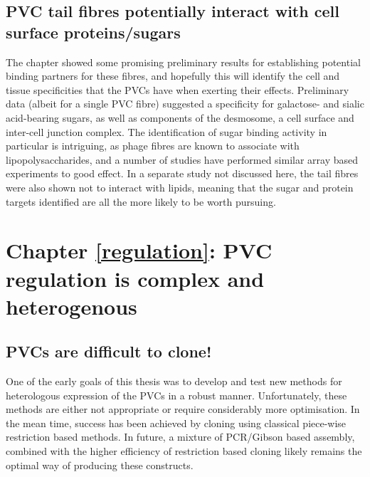 \subsection{PVC tail fibres potentially interact with cell surface proteins/sugars}
The chapter showed some promising preliminary results for establishing potential binding partners for these fibres, and hopefully this will identify the cell and tissue specificities that the PVCs have when exerting their effects. Preliminary data (albeit for a single PVC fibre) suggested a specificity for galactose- and sialic acid-bearing sugars, as well as components of the desmosome, a cell surface and inter-cell junction complex. The identification of sugar binding activity in particular is intriguing, as phage fibres are known to associate with lipopolysaccharides, and a number of studies have performed similar array based experiments to good effect. In a separate study not discussed here, the tail fibres were also shown not to interact with lipids, meaning that the sugar and protein targets identified are all the more likely to be worth pursuing.


\section{Chapter \ref{regulation}: PVC regulation is complex and heterogenous}
\subsection{PVCs are difficult to clone!}
One of the early goals of this thesis was to develop and test new methods for heterologous expression of the PVCs in a robust manner. Unfortunately, these methods are either not appropriate or require considerably more optimisation. In the mean time, success has been achieved by cloning using classical piece-wise restriction based methods. In future, a mixture of PCR/Gibson based assembly, combined with the higher efficiency of restriction based cloning likely remains the optimal way of producing these constructs.

